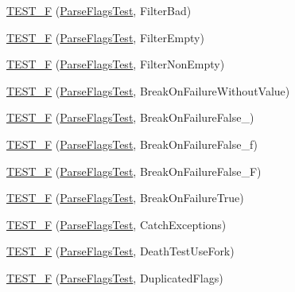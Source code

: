 \begin{DoxyCompactItemize}
\item 
\mbox{\hyperlink{namespacetesting_a3b7a3374630035ab3cf2125a0c960435}{T\+E\+S\+T\+\_\+F}} (\mbox{\hyperlink{classtesting_1_1_parse_flags_test}{Parse\+Flags\+Test}}, Filter\+Bad)
\item 
\mbox{\hyperlink{namespacetesting_ac368692db2bffa72a1bf12f3469efec0}{T\+E\+S\+T\+\_\+F}} (\mbox{\hyperlink{classtesting_1_1_parse_flags_test}{Parse\+Flags\+Test}}, Filter\+Empty)
\item 
\mbox{\hyperlink{namespacetesting_a31336a2ed0eea5de8066f5ae528a7ae0}{T\+E\+S\+T\+\_\+F}} (\mbox{\hyperlink{classtesting_1_1_parse_flags_test}{Parse\+Flags\+Test}}, Filter\+Non\+Empty)
\item 
\mbox{\hyperlink{namespacetesting_ab540cabc9d829c20052609a685a01832}{T\+E\+S\+T\+\_\+F}} (\mbox{\hyperlink{classtesting_1_1_parse_flags_test}{Parse\+Flags\+Test}}, Break\+On\+Failure\+Without\+Value)
\item 
\mbox{\hyperlink{namespacetesting_ac5a39f27868bd123d9c5bca03730845e}{T\+E\+S\+T\+\_\+F}} (\mbox{\hyperlink{classtesting_1_1_parse_flags_test}{Parse\+Flags\+Test}}, Break\+On\+Failure\+False\+\_)
\item 
\mbox{\hyperlink{namespacetesting_afe2c0e1666f3dad816ae5dbdfc37357a}{T\+E\+S\+T\+\_\+F}} (\mbox{\hyperlink{classtesting_1_1_parse_flags_test}{Parse\+Flags\+Test}}, Break\+On\+Failure\+False\+\_\+f)
\item 
\mbox{\hyperlink{namespacetesting_a92c1ef6a2453eaec5c33bb92dfd3667f}{T\+E\+S\+T\+\_\+F}} (\mbox{\hyperlink{classtesting_1_1_parse_flags_test}{Parse\+Flags\+Test}}, Break\+On\+Failure\+False\+\_\+F)
\item 
\mbox{\hyperlink{namespacetesting_a2a23ab14983f9e6296149ac711301968}{T\+E\+S\+T\+\_\+F}} (\mbox{\hyperlink{classtesting_1_1_parse_flags_test}{Parse\+Flags\+Test}}, Break\+On\+Failure\+True)
\item 
\mbox{\hyperlink{namespacetesting_a9e50d6fa46cc314e8d7fa4a829ee6c0d}{T\+E\+S\+T\+\_\+F}} (\mbox{\hyperlink{classtesting_1_1_parse_flags_test}{Parse\+Flags\+Test}}, Catch\+Exceptions)
\item 
\mbox{\hyperlink{namespacetesting_a767f2b2467c0242492922c205a666e64}{T\+E\+S\+T\+\_\+F}} (\mbox{\hyperlink{classtesting_1_1_parse_flags_test}{Parse\+Flags\+Test}}, Death\+Test\+Use\+Fork)
\item 
\mbox{\hyperlink{namespacetesting_a76c39020708d7e6646c8aeef149ea827}{T\+E\+S\+T\+\_\+F}} (\mbox{\hyperlink{classtesting_1_1_parse_flags_test}{Parse\+Flags\+Test}}, Duplicated\+Flags)
\item 

\end{DoxyCompactItemize}
